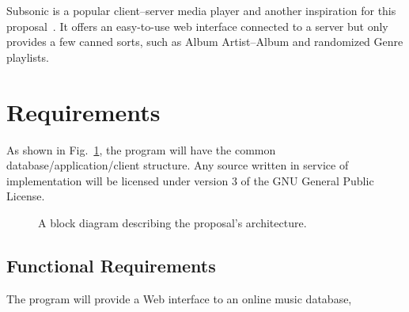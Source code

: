 \documentclass{abrice}
\begin{document}
Subsonic is a popular client--server media player and another inspiration for
this proposal~\cite{subsonic}. It offers an easy-to-use web interface connected
to a server but only provides a few canned sorts, such as Album Artist--Album
and randomized Genre playlists.

\section{Requirements}

As shown in Fig.~\ref{fig:arch}, the program will have the common
database/application/client structure. Any source written in service of
implementation will be licensed under version 3 of the GNU General Public
License.

\begin{figure}
  \label{fig:arch}
  \centering
  \caption{A block diagram describing the proposal's architecture.}
\end{figure}

\subsection{Functional Requirements}

The program will provide a Web interface to an online music database,

\end{document}
